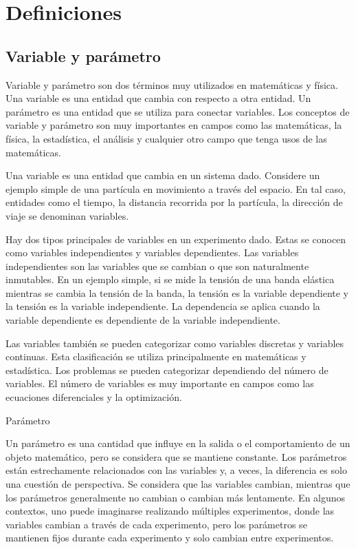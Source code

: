 \pagebreak
\section{Definiciones}

\subsection{Variable y parámetro}

Variable y parámetro son dos términos muy utilizados en matemáticas y física.
Una variable es una entidad que cambia con respecto a otra entidad. Un parámetro
es una entidad que se utiliza para conectar variables. Los conceptos de variable
y parámetro son muy importantes en campos como las matemáticas, la física, la
estadística, el análisis y cualquier otro campo que tenga usos de las
matemáticas.

Una variable es una entidad que cambia en un sistema dado. Considere un ejemplo
simple de una partícula en movimiento a través del espacio. En tal caso,
entidades como el tiempo, la distancia recorrida por la partícula, la dirección
de viaje se denominan variables.

Hay dos tipos principales de variables en un experimento dado. Estas se conocen
como variables independientes y variables dependientes. Las variables
independientes son las variables que se cambian o que son naturalmente
inmutables. En un ejemplo simple, si se mide la tensión de una banda elástica
mientras se cambia la tensión de la banda, la tensión es la variable dependiente
y la tensión es la variable independiente. La dependencia se aplica cuando la
variable dependiente es dependiente de la variable independiente.

Las variables también se pueden categorizar como variables discretas y variables
continuas. Esta clasificación se utiliza principalmente en matemáticas y
estadística. Los problemas se pueden categorizar dependiendo del número de
variables. El número de variables es muy importante en campos como las
ecuaciones diferenciales y la optimización.

Parámetro

Un parámetro es una cantidad que influye en la salida o el comportamiento de un
objeto matemático, pero se considera que se mantiene constante. Los parámetros
están estrechamente relacionados con las variables y, a veces, la diferencia es
solo una cuestión de perspectiva. Se considera que las variables cambian,
mientras que los parámetros generalmente no cambian o cambian más lentamente. En
algunos contextos, uno puede imaginarse realizando múltiples experimentos, donde
las variables cambian a través de cada experimento, pero los parámetros se
mantienen fijos durante cada experimento y solo cambian entre experimentos.

